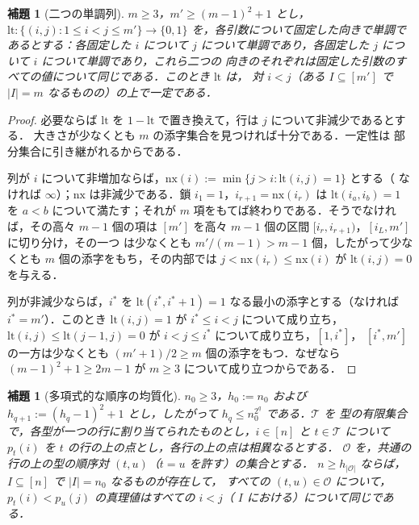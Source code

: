 \documentclass[11pt,a4paper]{ltjsarticle}
\numberwithin{equation}{section}
\theoremstyle{plain}
\newtheorem{lemma}[theorem]{補題}
\theoremstyle{definition}
\theoremstyle{remark}
\theoremstyle{plain}
\begin{document}
\begin{lemma}[二つの単調列]
\label{lem:two-sequence}
$m\ge3$，$m'\ge(m-1)^2+1$ とし，$\mathrm{lt}:\{(i,j):1\le i<j\le m'\}\to\{0,1\}$
を，各引数について固定した向きで単調であるとする：各固定した $i$ について
$j$ について単調であり，各固定した $j$ について $i$ について単調であり，これら二つの
向きのそれぞれは固定した引数のすべての値について同じである．このとき $\mathrm{lt}$ は，
対 $i<j$（ある $I\subseteq[m']$ で $|I|=m$ なるものの）の上で一定である．
\end{lemma}

\begin{proof}
必要ならば $\mathrm{lt}$ を $1-\mathrm{lt}$ で置き換えて，行は $j$ について非減少であるとする．
大きさが少なくとも $m$ の添字集合を見つければ十分である．一定性は
部分集合に引き継がれるからである．

列が $i$ について非増加ならば，$\mathrm{nx}(i):=\min\{j>i:\mathrm{lt}(i,j)=1\}$ とする（
なければ $\infty$）；$\mathrm{nx}$ は非減少である．鎖 $i_1=1$，$i_{r+1}=\mathrm{nx}(i_r)$ は
$\mathrm{lt}(i_a,i_b)=1$ を $a<b$ について満たす；それが $m$ 項をもてば終わりである．そうでなければ，その高々
$m-1$ 個の項は $[m']$ を高々 $m-1$ 個の区間 $[i_r,i_{r+1})$，$[i_L,m']$ に切り分け，その一つ
は少なくとも $m'/(m-1)>m-1$ 個，したがって少なくとも $m$ 個の添字をもち，その内部では $j<\mathrm{nx}(i_r)\le \mathrm{nx}(i)$ が
$\mathrm{lt}(i,j)=0$ を与える．

列が非減少ならば，$i^\ast$ を
$\mathrm{lt}(i^\ast,i^\ast+1)=1$ なる最小の添字とする（なければ $i^\ast=m'$）．このとき $\mathrm{lt}(i,j)=1$ が $i^\ast\le i<j$ について成り立ち，
$\mathrm{lt}(i,j)\le \mathrm{lt}(j-1,j)=0$ が $i<j\le i^\ast$ について成り立ち，$[1,i^\ast]$，
$[i^\ast,m']$ の一方は少なくとも $(m'+1)/2\ge m$ 個の添字をもつ．なぜなら $(m-1)^2+1\ge2m-1$ が
$m\ge3$ について成り立つからである．
\end{proof}

\begin{lemma}[多項式的な順序の均質化]
\label{lem:order-homogenize}
$n_0\ge3$，$h_0:=n_0$ および $h_{q+1}:=(h_q-1)^2+1$ とし，したがって $h_q\le n_0^{2^q}$ である．$\mathcal T$ を
型の有限集合で，各型が一つの行に割り当てられたものとし，$i\in[n]$ と $t\in \mathcal T$ について
$p_t(i)$ を $t$ の行の上の点とし，各行の上の点は相異なるとする．
$\mathcal O$ を，共通の行の上の型の順序対 $(t,u)$（$t=u$ を許す）の集合とする．
$n\ge h_{|\mathcal O|}$ ならば，$I\subseteq[n]$ で $|I|=n_0$ なるものが存在して，
すべての $(t,u)\in\mathcal O$ について，$p_t(i)<p_u(j)$ の真理値はすべての $i<j$（
$I$ における）について同じである．
\end{lemma}
\end{document}
